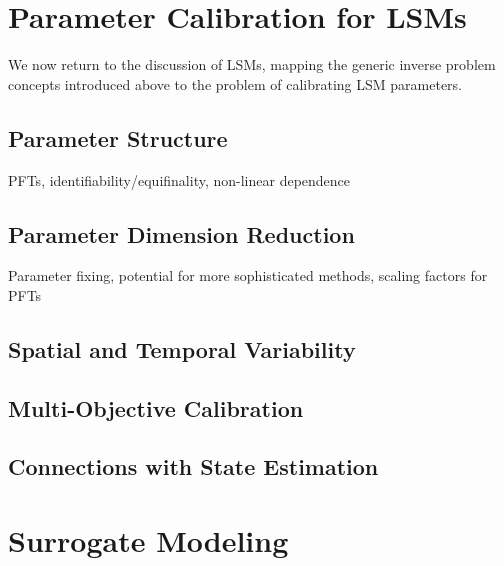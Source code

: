 \documentclass[12pt]{article}
\begin{document}
\section{Parameter Calibration for LSMs}
We now return to the discussion of LSMs, mapping the generic inverse problem concepts introduced above to the problem 
of calibrating LSM parameters. 

\subsection{Parameter Structure}
PFTs, identifiability/equifinality, non-linear dependence 

\subsection{Parameter Dimension Reduction}
Parameter fixing, potential for more sophisticated methods, scaling factors for PFTs

\subsection{Spatial and Temporal Variability}

\subsection{Multi-Objective Calibration}

\subsection{Connections with State Estimation}

\section{Surrogate Modeling}
\end{document}
